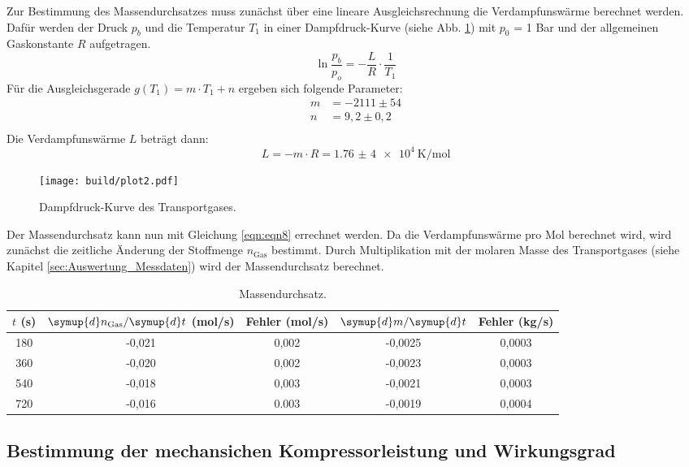 Zur Bestimmung des Massendurchsatzes muss zunächst über eine lineare Ausgleichsrechnung die Verdampfunswärme berechnet werden.
Dafür werden der Druck $p_b$ und die Temperatur $T_1$ in einer Dampfdruck-Kurve (siehe Abb. \ref{fig:plot2}) mit $p_0$ = 1 Bar und der allgemeinen Gaskonstante $R$ aufgetragen.
\begin{equation*}
  \ln{\frac{p_b}{p_o}} = - \frac{L}{R} \cdot \frac{1}{T_1}
\end{equation*}
Für die Ausgleichsgerade $g(T_1) = m \cdot T_1 + n$ ergeben sich folgende Parameter:
\begin{align*}
  m &= -2111 \pm 54 \\
  n &= 9,2 \pm 0,2 \\
\end{align*}
Die Verdampfunswärme $L$ beträgt dann:
\begin{equation*}
  L = - m \cdot R = \SI{1,76(4)e4}{\kelvin\per\mol}
\end{equation*}
\begin{figure}
  \centering
  \texttt{[image: build/plot2.pdf]}
  \caption{Dampfdruck-Kurve des Transportgases.}
  \label{fig:plot2}
\end{figure}
\FloatBarrier
Der Massendurchsatz kann nun mit Gleichung \eqref{eqn:eqn8} errechnet werden.
Da die Verdampfunswärme pro Mol berechnet wird, wird zunächst die zeitliche Änderung der Stoffmenge $n_{\text{Gas}}$ bestimmt.
Durch Multiplikation mit der molaren Masse des Transportgases (siehe Kapitel \ref{sec:Auswertung_Messdaten}) wird der Massendurchsatz berechnet.
\begin{table}
  \centering
  \caption{Massendurchsatz.}
  \label{tab:Massendurchsatz}
  \begin{tabular}{c c c c c}
    \toprule
    $t$ (s) & $\symup{d}n_{\text{Gas}}/\symup{d}t$ (mol/s) & Fehler (mol/s) & $\symup{d}m/\symup{d}t$ & Fehler (kg/s)  \\
    \midrule
    180 & -0,021 & 0,002 & -0,0025 & 0,0003 \\
    360 & -0,020 & 0,002 & -0,0023 & 0,0003 \\
    540 & -0,018 & 0,003 & -0,0021 & 0,0003 \\
    720 & -0,016 & 0.003 & -0,0019 & 0,0004 \\
    \bottomrule
  \end{tabular}
\end{table}

\subsection{Bestimmung der mechansichen Kompressorleistung und Wirkungsgrad}
\label{sec:Auswertung_Leistung}

